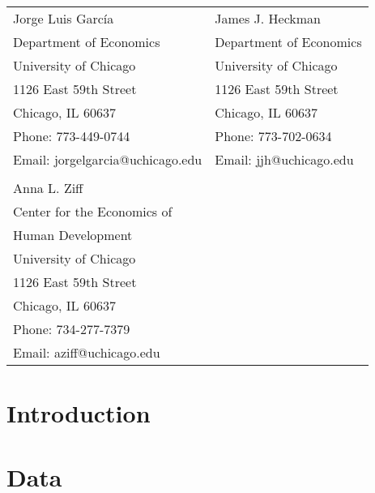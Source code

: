 \bigskip
\begin{tabular}{ll}
Jorge Luis Garc\'{i}a                                       & James J. Heckman \\
Department of Economics                                & Department of Economics \\
University of Chicago                                       & University of Chicago \\
1126 East 59th Street                                     & 1126 East 59th Street \\
Chicago, IL 60637                                           & Chicago, IL 60637 \\
Phone: 773-449-0744                                    & Phone: 773-702-0634  \\
Email: jorgelgarcia@uchicago.edu                       & Email: jjh@uchicago.edu \\
                                                                       & \\
Anna L. Ziff                                         &  \\
Center for the Economics of & \\
Human Development            & \\
University of Chicago                                        &  \\
1126 East 59th Street                       & \\
Chicago, IL 60637                                              &       \\
Phone: 734-277-7379                                    &  \\
Email: aziff@uchicago.edu                     &  \\

\end{tabular}

\clearpage

\restoregeometry
\doublespacing


\setcounter{page}{0}

\setlength\parindent{0pt}
\setlength{\parskip}{10pt}

\section{Introduction}
\label{sec:introduction}
	

\section{Data}
\label{sec:data}


